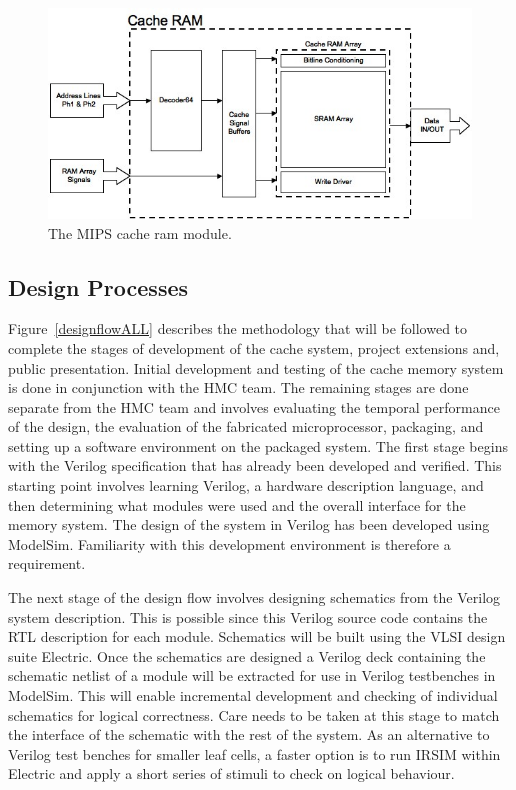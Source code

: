 \begin{figure}
\centering 
\includegraphics[width=\textwidth]{cacheram.jpg}
\caption{The MIPS cache ram module.}
\label{cacheram}
\end{figure}

\subsection{Design Processes}

Figure~\ref{designflowALL} describes the methodology that will be followed to complete the stages of development of the cache system, project extensions and, public presentation. Initial development and testing of the cache memory system is done in conjunction with the HMC team. The remaining stages are done separate from the HMC team and involves evaluating the temporal performance of the design, the evaluation of the fabricated microprocessor, packaging, and setting up a software environment on the packaged system. The first stage begins with the Verilog specification that has already been developed and verified. This starting point involves learning Verilog, a hardware description language, and then determining what modules were used and the overall interface for the memory system. The design of the system in Verilog has been developed using ModelSim. Familiarity with this development environment is therefore a requirement.

The next stage of the design flow involves designing schematics from the Verilog system description. This is possible since this Verilog source code contains the RTL description for each module. Schematics will be built using the VLSI design suite Electric. Once the schematics are designed a Verilog deck containing the schematic netlist of a module will be extracted for use in Verilog testbenches in ModelSim. This will enable incremental development and checking of individual schematics for logical correctness. Care needs to be taken at this stage to match the interface of the schematic with the rest of the system. As an alternative to Verilog test benches for smaller leaf cells, a faster option is to run IRSIM within Electric and apply a short series of stimuli to check on logical behaviour.

